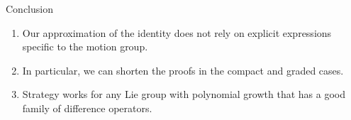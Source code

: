 \documentclass{beamer}
\begin{document}
\begin{frame}{Conclusion}
    \begin{enumerate}
        \item Our approximation of the identity does not rely on explicit expressions specific to the motion group.
            \pause
        \item In particular,
            we can shorten the proofs in the compact and graded cases.
            \pause
        \item Strategy works for any Lie group with polynomial growth that has a good family of difference operators.
    \end{enumerate}
\end{frame}
\end{document}
